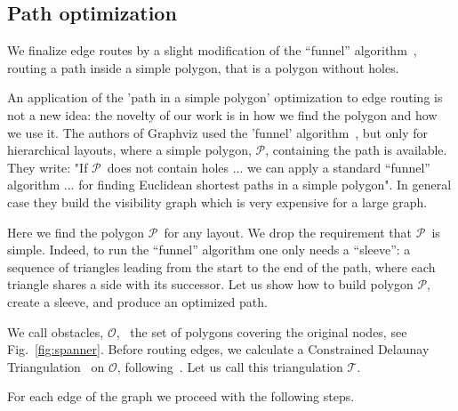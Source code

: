 \documentclass{llncs}
\newcommand{\plg}{$\mathcal{P}$}
\begin{document}
\subsection{Path optimization} {
We finalize edge routes by a slight modification of the “funnel” algorithm~\cite{chazelle1982theorem,hershberger1994computing}, routing a path inside a simple polygon, that is a polygon without holes.

An application of the 'path in a simple polygon' optimization to edge routing is not a new idea: the novelty of our work is in how we find the polygon and how we use it.
The authors of Graphviz used the 'funnel' algorithm~\cite{dobkin1997implementing}, but only for hierarchical layouts, where a simple polygon, \plg, containing the path is available. They write: "If \plg~does not contain holes ... we can apply a
standard “funnel” algorithm ... for finding Euclidean shortest paths in a simple polygon". In general case they build the visibility graph which is very expensive for a large graph.

Here we find the polygon \plg~for any layout. We drop the requirement that \plg~is simple. Indeed, to run the “funnel” algorithm one only needs a “sleeve”: a sequence of triangles leading from the start to the end of the path, where each triangle shares a side with its successor. Let us show how to build polygon \plg, create a sleeve, and produce an optimized path.

We call obstacles, $\mathcal{O}$, ~the set of polygons covering the original nodes, see Fig.~\ref{fig:spanner}. Before routing edges, we calculate a Constrained Delaunay Triangulation~\cite{delaunay1934sphere} on $\mathcal{O}$, following~\cite{domiter2008sweep}. Let us call this triangulation $\mathcal{T}$.

For each edge of the graph we proceed with the following steps.

}
\end{document}
